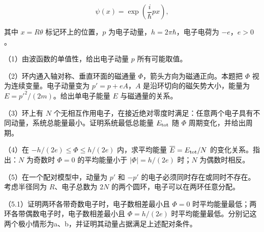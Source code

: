 \documentclass[12pt,a4paper,fontset=fandol]{ctexart}
\begin{document}
\[\psi(x)=\exp\left(\frac i\hbar px\right),\]

其中 \(x=R\theta\) 标记环上的位置，\(p\)
为电子动量，\(h=2\pi\hbar\)，电子电荷为 \(-e\)，\(e>0\)。

\begin{center}
\begin{minipage}{\linewidth}
\centering\begingroup
{}
\ifdim\wd\diagrambox>.88\linewidth
\sbox{\diagrambox}{\resizebox{.88\linewidth}{!}{\usebox{\diagrambox}}}
\fi
\ifdim\ht\diagrambox>.40\textheight
\resizebox{!}{.40\textheight}{\usebox{\diagrambox}}
\else\usebox{\diagrambox}\fi
\par{}
\endgroup\end{minipage}
\end{center}

（1）由波函数的单值性，给出电子动量 \(p\) 所有可能取值。

（2）环内通入轴对称、垂直环面的磁通量
\(\Phi\)，箭头方向为磁通正向。本题把 \(\Phi\) 视为连续变量。电子动量变为
\(p'=p+eA\)，\(A\) 是沿环切向的磁矢势大小，能量为
\(E=p'^2/(2m)\)。给出单电子能量 \(E\) 与磁通量的关系。

（3）环上有 \(N\)
个无相互作用电子，在接近绝对零度时满足：任意两个电子具有不同动量，系统总能量最小。证明系统最低总能量
\(E_{\rm tot}\) 随 \(\Phi\) 周期变化，并给出周期。

（4）在 \(-h/(2e)\le\Phi\le h/(2e)\) 内，求平均能量
\(\overline E=E_{\rm tot}/N\) 的变化关系。指出：\(N\) 为奇数时
\(\Phi=0\) 的平均能量小于 \(|\Phi|=h/(2e)\) 时；\(N\) 为偶数时相反。

（5）在一个配对模型中，动量为 \(p'\) 和 \(-p'\)
的电子必须同时存在或同时不存在。考虑半径同为 \(R\)、电子总数为 \(2N\)
的两个圆环，电子可以在两环任意分配。

（5.1）证明两环各带奇数电子时，电子数相差最小且 \(\Phi=0\)
时平均能量最低；两环各带偶数电子时，电子数相差最小且 \(\Phi=h/(2e)\)
时平均能量最低。分别记这两个极小情形为a、b，并证明其动量占据满足上述配对条件。
\end{document}

